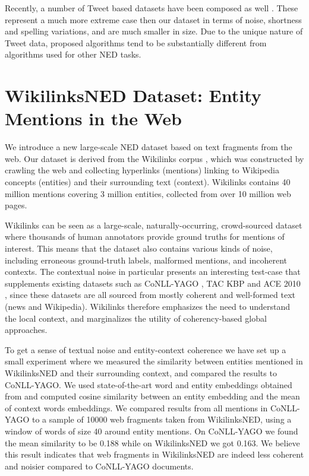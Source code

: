 \documentclass[11pt]{article}
\begin{document}
Recently, a number of Tweet based datasets have been composed as well \cite{locke2009named, habib2012unsupervised, cano2014making, fromreide2014crowdsourcing}. These represent a much more extreme case then our dataset in terms of noise, shortness and spelling variations, and are much smaller in size. Due to the unique nature of Tweet data, proposed algorithms tend to be substantially different from algorithms used for other NED tasks.

\section{WikilinksNED Dataset: Entity Mentions in the Web}
\label{sec:w}

We introduce a new large-scale NED dataset based on text fragments from the web. Our dataset is derived from the Wikilinks corpus \cite{singh12:wiki-links}, which was constructed by crawling the web and collecting hyperlinks (mentions) linking to Wikipedia concepts (entities) and their surrounding text (context). Wikilinks contains 40 million mentions covering 3 million entities, collected from over 10 million web pages. 

Wikilinks can be seen as a large-scale, naturally-occurring, crowd-sourced dataset where thousands of human annotators provide ground truths for mentions of interest. This means that the dataset also contains various kinds of noise, including erroneous ground-truth labels, malformed mentions, and incoherent contexts. The contextual noise in particular presents an interesting test-case that supplements existing datasets such as CoNLL-YAGO \cite{hoffart2011robust}, TAC KBP \cite{ji2010overview} and ACE 2010 \cite{bentivogli2010extending}, since these datasets are all sourced from mostly coherent and well-formed text (news and Wikipedia). Wikilinks therefore emphasizes the need to understand the local context, and marginalizes the utility of coherency-based global approaches. 

To get a sense of textual noise and entity-context coherence we have set up a small experiment where we measured the similarity between entities mentioned in WikilinksNED and their surrounding context, and compared the results to CoNLL-YAGO. We used state-of-the-art word and entity embeddings obtained from  and computed cosine similarity between an entity embedding and the mean of context words embeddings. We compared results from all mentions in CoNLL-YAGO to a sample of 10000 web fragments taken from WikilinksNED, using a window of words of size 40 around entity mentions. On CoNLL-YAGO we found the mean similarity to be 0.188 while on WikilinksNED we got 0.163. We believe this result indicates that web fragments in WikilinksNED are indeed less coherent and noisier compared to CoNLL-YAGO documents.
\end{document}
